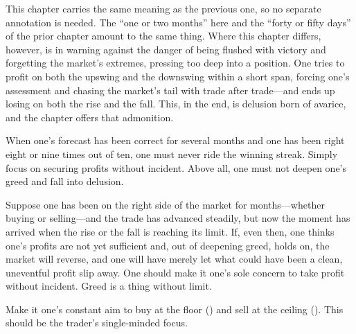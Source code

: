 \commentary
This chapter carries the same meaning as the previous one, so no
separate annotation is needed. The ``one or two months'' here and
the ``forty or fifty days'' of the prior chapter amount to the same
thing. Where this chapter differs, however, is in warning against
the danger of being flushed with victory and forgetting the market's
extremes, pressing too deep into a position. One tries to profit on
both the upswing and the downswing within a short span, forcing
one's assessment and chasing the market's tail with trade after
trade---and ends up losing on both the rise and the fall. This,
in the end, is delusion born of avarice, and the chapter offers
that admonition.


\begin{sokyubox}
{\small\itshape\color{sokyubar} }

\medskip
When one's forecast has been correct for several months and one has
been right eight or nine times out of ten, one must never ride the
winning streak. Simply focus on securing profits without incident.
Above all, one must not deepen one's greed and fall into delusion.
\end{sokyubox}

\commentary
Suppose one has been on the right side of the market for months---whether buying or selling---and the trade has advanced steadily,
but now the moment has arrived when the rise or the fall is
reaching its limit. If, even then, one thinks one's profits are
not yet sufficient and, out of deepening greed, holds on, the
market will reverse, and one will have merely let what could have
been a clean, uneventful profit slip away. One should make it
one's sole concern to take profit without incident. Greed is a
thing without limit.


\begin{sokyubox}
{\small\itshape\color{sokyubar} }

\medskip
Make it one's constant aim to buy at the floor () and
sell at the ceiling (). This should be the trader's
single-minded focus.
\end{sokyubox}

